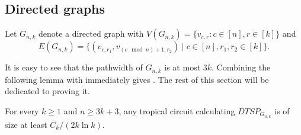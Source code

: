 \subsection{Directed graphs}

Let $G_{n, k}$ denote a directed graph with
$
V(G_{n, k}) = \{ v_{c, r} \colon c \in [n], r \in [k] \}
$
and
$$
E(G_{n, k}) = \{ (v_{c, r_1}, v_{(c \mod n) + 1, r_2}) \mid c \in [n], r_1, r_2 \in [k] \}.
$$


It is easy to see that the pathwidth of $G_{n, k}$ is at most $3k$.
Combining the following lemma with  immediately gives . The rest of this section will be dedicated to proving it.

\begin{lemma}\label{lem:main_dtsp}
    For every $k \geq 1$ and $n \geq 3k + 3$, any tropical circuit calculating $DTSP_{G_{n, k}}$ is of size at least $C_k / (2k \ln k)$.
\end{lemma}


